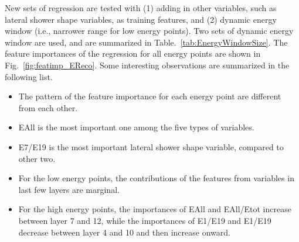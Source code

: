 New sets of regression are tested with (1) adding in other variables, such as lateral shower shape variables, as training features, and (2) dynamic energy window (i.e., narrower range for low energy points). Two sets of dynamic energy window are used, and are summarized in Table.~\ref{tab:EnergyWindowSize}. The feature importances of the regression for all energy points are shown in Fig.~\ref{fig:featimp_EReco}. Some interesting observations are summarized in the following list.
\begin{itemize}  
\item The pattern of the feature importance for each energy point are different from each other. 
\item EAll is the most important one among the five types of variables. 
\item E7/E19 is the most important lateral shower shape variable, compared to other two.
\item For the low energy points, the contributions of the features from variables in last few layers are marginal. 
\item For the high energy points, the importances of EAll and EAll/Etot increase between layer 7 and 12, while the importances of E1/E19 and E1/E19 decrease between layer 4 and 10 and then increase onward.
\end{itemize}

